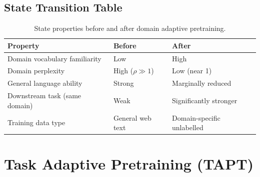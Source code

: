 \documentclass{article}
\begin{document}
\subsection{State Transition Table}
\begin{table}[h]\centering
\begin{tabular}{lll}\toprule
\textbf{Property} & \textbf{Before} & \textbf{After}\\\midrule
Domain vocabulary familiarity & Low & High\\
Domain perplexity & High ($\rho \gg 1$) & Low (near 1)\\
General language ability & Strong & Marginally reduced\\
Downstream task (same domain) & Weak & Significantly stronger\\
Training data type & General web text & Domain-specific unlabelled\\\bottomrule
\end{tabular}
\caption{State properties before and after domain adaptive pretraining.}
\end{table}

\newpage
\section{Task Adaptive Pretraining (TAPT)}
\end{document}
